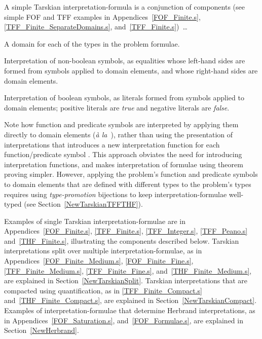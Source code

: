 \documentclass{easychair}
\newenvironment{packed_itemize}{
\vspace*{-0.3em}
\begin{itemize}
\setlength{\partopsep}{0pt}
\setlength{\itemsep}{1pt}
\setlength{\parskip}{0pt}
\setlength{\parsep}{0pt}
}{\end{itemize}}
\begin{document}
A simple Tarskian interpretation-formula is a conjunction of components (see simple FOF and TFF
examples in Appendices~\ref{FOF_Finite.s}, \ref{TFF_Finite_SeparateDomains.s}, 
and~\ref{TFF_Finite.s})~\ldots
\begin{packed_itemize}
\item A domain for each of the types in the problem formulae.
\item Interpretation of non-boolean symbols, as equalities whose left-hand sides are formed from 
      symbols applied to domain elements, and whose right-hand sides are domain elements.
\item Interpretation of boolean symbols, as literals formed from symbols applied to domain 
      elements; positive literals are \emph{true} and negative literals are \emph{false}.
\end{packed_itemize}

Note how function and predicate symbols are interpreted by applying them directly to domain
elements (\emph{{\`a} la}~\cite[\S5.3.4]{Gal15}), rather than using the presentation of 
interpretations that introduces a new interpretation function for each function/predicate symbol 
\cite[\S5.3.2]{Gal15}.
This approach obviates the need for introducing interpretation functions, and makes 
interpretation of formulae using theorem proving simpler.
However, applying the problem's function and predicate symbols to domain elements that are 
defined with different types to the problem's types requires using \emph{type-promotion} 
bijections to keep interpretation-formulae well-typed (see Section~\ref{NewTarskianTFFTHF}).

Examples of single Tarskian interpretation-formulae are in Appendices~\ref{FOF_Finite.s}, 
\ref{TFF_Finite.s}, \ref{TFF_Integer.s}, \ref{TFF_Peano.s} and~\ref{THF_Finite.s}, illustrating 
the components described below. 
Tarskian interpretations split over multiple interpretation-formulae, as in 
Appendices~\ref{FOF_Finite_Medium.s}, \ref{FOF_Finite_Fine.s}, \ref{TFF_Finite_Medium.s}, 
\ref{TFF_Finite_Fine.s}, and~\ref{THF_Finite_Medium.s}, are explained in 
Section~\ref{NewTarskianSplit}.
Tarskian interpretations that are compacted using quantification, as in \ref{TFF_Finite_Compact.s}
and~\ref{THF_Finite_Compact.s}, are explained in Section~\ref{NewTarskianCompact}.
Examples of interpretation-formulae that determine Herbrand interpretations, as in 
Appendices~\ref{FOF_Saturation.s}, and~\ref{FOF_Formulae.s}, are explained in 
Section~\ref{NewHerbrand}.
\end{document}
